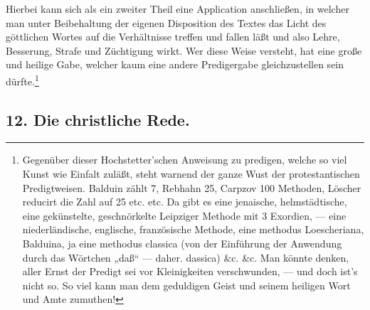 Hierbei kann sich als ein zweiter Theil eine Application anschließen, in welcher man unter Beibehaltung der eigenen Disposition des Textes das Licht des göttlichen Wortes auf die Verhältnisse treffen und fallen läßt und also Lehre, Besserung, Strafe und Züchtigung wirkt. Wer diese Weise versteht, hat eine große und heilige Gabe, welcher kaum eine andere Predigergabe gleichzustellen sein dürfte.\footnote{Gegenüber dieser Hochstetter’schen Anweisung zu predigen, welche so viel Kunst wie Einfalt zuläßt, steht warnend der ganze Wust der protestantischen Predigtweisen. Balduin zählt 7, Rebhahn 25, Carpzov 100 Methoden, Löscher reducirt die Zahl auf 25 etc. etc. Da gibt es eine jenaische, helmstädtische, eine gekünstelte, geschnörkelte Leipziger Methode mit 3 Exordien, — eine niederländische, englische, französische Methode, eine methodus Loescheriana, Balduina, ja eine methodus classica (von der Einführung der Anwendung durch das Wörtchen „daß“ — daher. dassica) \&c. \&c. Man könnte denken, aller Ernst der Predigt sei vor Kleinigkeiten verschwunden, — und doch ist’s nicht so. So viel kann man dem geduldigen Geist und seinem heiligen Wort und Amte zumuthen!}

\subsection*{12. Die christliche Rede.}

